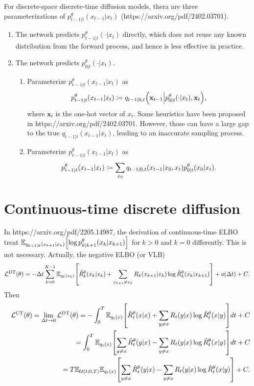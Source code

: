 \documentclass[10pt]{article}
\begin{document}
For discrete-space discrete-time diffusion models, thera are three parameterizations of $p^\theta_{t-1|t}(x_{t-1}|x_t)$ (https://arxiv.org/pdf/2402.03701).
\begin{enumerate}
  \item The network predicts $p^\theta_{t-1|t}(\cdot|x_t)$ directly, which does not reuse any known distribution from the forward process, and hence is less effective in practice.
  \item The network predicts $p^\theta_{0|t}(\cdot|x_t)$.
  \begin{enumerate}
    \item Parameterize $p^\theta_{t-1|t}(x_{t-1}|x_t)$ as
    \begin{eqnarray*}
      p^\theta_{t-1|t}(x_{t-1}|x_t)\coloneq q_{t-1|0,t}\qty(\mathbf{x}_{t-1}\middle|p^\theta_{0|t}(\cdot|x_t),\mathbf{x}_t),
    \end{eqnarray*}
    where $\mathbf{x}_t$ is the one-hot vector of $x_t$. Some heuristics have been proposed in https://arxiv.org/pdf/2402.03701. However, those can have a large gap to the true $q_{t-1|t}(x_{t−1}|x_t)$, leading to an inaccurate sampling process.
    \item Parameterize $p^\theta_{t-1|t}(x_{t-1}|x_t)$ as
    \begin{eqnarray*}
      p^\theta_{t-1|t}(x_{t-1}|x_t)\coloneq \sum_{x_0}q_{t-1|0,t}\qty(x_{t-1}|x_0,x_t)p^\theta_{0|t}(x_0|x_t).
    \end{eqnarray*}
  \end{enumerate}
\end{enumerate}

\section{Continuous-time discrete diffusion}
In https://arxiv.org/pdf/2205.14987, the derivation of continuous-time ELBO treat $\mathbb{E}_{q_{k+1|k}(x_{k+1}|x_k)}\qty[\log p_{k|k+1}^\theta(x_k|x_{k+1})]$ for $k>0$ and $k=0$ differently. This is not necessary. Actually, the negative ELBO (or VLB)
\begin{eqnarray*}
  \mathcal{L}^\text{DT}(\theta) = -\Delta t\sum_{k=0}^{K-1}\mathbb{E}_{q_k(x_k)}\qty[\hat{R}_k^\theta(x_k|x_k) + \sum_{x_{k+1}\neq x_k}R_k(x_{k+1}|x_k)\log\hat{R}_k^\theta(x_k|x_{k+1})] + o(\Delta t) + C.
\end{eqnarray*}
Then
\begin{eqnarray*}
  &&\mathcal{L}^\text{CT}(\theta) = \lim_{\Delta t\to 0}\mathcal{L}^\text{DT}(\theta) = - \int_0^T \mathbb{E}_{q_t(x)}\qty[\hat{R}_t^\theta(x|x) + \sum_{y\neq x}R_t(y|x)\log\hat{R}_t^\theta(x|y)]dt + C\\
  &&=\int_0^T \mathbb{E}_{q_t(x)}\qty[\sum_{y\neq x}\hat{R}_t^\theta(y|x) - \sum_{y\neq x}R_t(y|x)\log\hat{R}_t^\theta(x|y)]dt + C\\
  &&=T\mathbb{E}_{\mathcal{U}(t;0,T)}\mathbb{E}_{q_t(x)}\qty[\sum_{y\neq x}\hat{R}_t^\theta(y|x) - \sum_{y\neq x}R_t(y|x)\log\hat{R}_t^\theta(x|y)] + C.
\end{eqnarray*}
\end{document}
